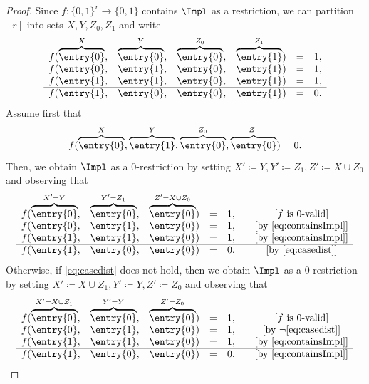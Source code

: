 \begin{proof}
Since $f:\{0,1\}^r \to \{0,1\}$ contains $\Impl$ as a restriction, we can partition $[r]$ into sets $X,Y,Z_0,Z_1$ and write
\begin{align}\label{eq:containsImpl}
\begin{matrix}
f( \overbrace{\entry{0}}^{X},& \overbrace{\entry{0}}^{Y}, & \overbrace{\entry{0}}^{Z_0}, & \overbrace{\entry{1}}^{Z_1}) & = & 1,\\
f( \entry{0},& \entry{1}, & \entry{0}, & \entry{1}) & = & 1,\\
f( \entry{1},& \entry{1}, & \entry{0}, & \entry{1}) & = & 1,\\
  \hline
f( \entry{1},& \entry{0}, & \entry{0}, & \entry{1}) & = & 0.\\
\end{matrix}
\end{align}
Assume first that 
\begin{equation}\label{eq:casedist}
f(\overbrace{\entry{0}}^{X}, \overbrace{\entry{1}}^Y, \overbrace{\entry{0}}^{Z_0}, \overbrace{\entry{0}}^{Z_1}) = 0.
\end{equation}
Then, we obtain $\Impl$ as a 0-restriction by setting $X'\coloneqq Y, Y'\coloneqq Z_1, Z' \coloneqq X\cup Z_0$ and observing that
\begin{align*}
\begin{matrix}
f( \overbrace{\entry{0}}^{X'=Y},& \overbrace{\entry{0}}^{Y'=Z_1}, & \overbrace{\entry{0}}^{Z'=X\cup Z_0}) & = & 1, & \quad \text{[$f$ is $0$-valid]}\\
f( \entry{0},& \entry{1}, & \entry{0}) & = & 1, & \quad\text{[by \eqref{eq:containsImpl}]}\\
f( \entry{1},& \entry{1}, & \entry{0}) & = & 1, & \quad\text{[by \eqref{eq:containsImpl}]}\\
  \hline
f( \entry{1},& \entry{0}, & \entry{0}) & = & 0. & \quad\text{[by \eqref{eq:casedist}]}\\
\end{matrix}
\end{align*}
Otherwise, if \eqref{eq:casedist} does not hold, then we obtain $\Impl$ as a 0-restriction by setting $X'\coloneqq X\cup Z_1, Y' \coloneqq Y, Z' \coloneqq Z_0$ and observing that 
\begin{align*}
\begin{matrix}
f( \overbrace{\entry{0}}^{X'=X\cup Z_1},& \overbrace{\entry{0}}^{Y'=Y}, & \overbrace{\entry{0}}^{Z'=Z_0}) & = & 1, & \quad \text{[$f$ is $0$-valid]}\\
f( \entry{0},& \entry{1}, & \entry{0}) & = & 1, & \quad\text{[by $\neg$\eqref{eq:casedist}]}\\
f( \entry{1},& \entry{1}, & \entry{0}) & = & 1, & \quad\text{[by \eqref{eq:containsImpl}]}\\
  \hline
f( \entry{1},& \entry{0}, & \entry{0}) & = & 0. & \quad\text{[by \eqref{eq:containsImpl}]}\\
\end{matrix}
\end{align*}
\end{proof}
